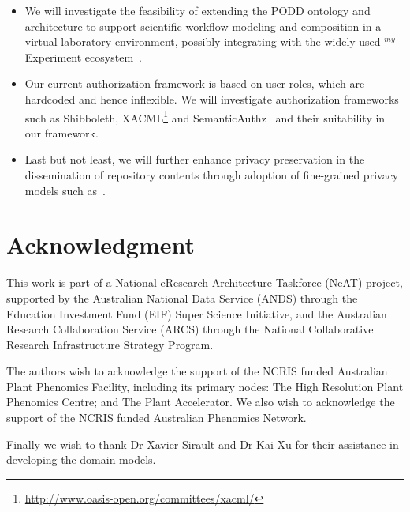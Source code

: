 \documentclass[preprint,12pt]{elsarticle}
\begin{document}
\begin{itemize}
\item We will investigate the feasibility of extending the PODD ontology and architecture to support scientific workflow modeling and composition in a virtual laboratory environment, possibly integrating with the widely-used $^{my}$Experiment ecosystem~\cite{DBLP:journals/fgcs/RoureGS09}. 

\item Our current authorization framework is based on user roles,  which are hardcoded and hence inflexible. We will investigate authorization frameworks such as Shibboleth, XACML\footnote{\url{http://www.oasis-open.org/committees/xacml/}} and SemanticAuthz~\cite{MarinPerez201140} and their suitability in our framework. 

\item Last but not least, we will further enhance privacy preservation in the dissemination of repository contents through adoption of fine-grained privacy models such as~\cite{Sun2011348}.
\end{itemize}

\section*{Acknowledgment}
This work is part of a National eResearch Architecture Taskforce (NeAT) project, supported by the Australian National Data Service (ANDS) through the Education Investment Fund (EIF) Super Science Initiative, and the Australian Research Collaboration Service (ARCS) through the National Collaborative Research Infrastructure Strategy Program. 

The authors wish to acknowledge the support of the NCRIS funded Australian Plant Phenomics Facility, including its primary nodes: The High Resolution Plant Phenomics Centre; and The Plant Accelerator. We also wish to acknowledge the support of the NCRIS funded Australian Phenomics Network.

Finally we wish to thank Dr Xavier Sirault and Dr Kai Xu for their assistance in developing the domain models.



\end{document}
